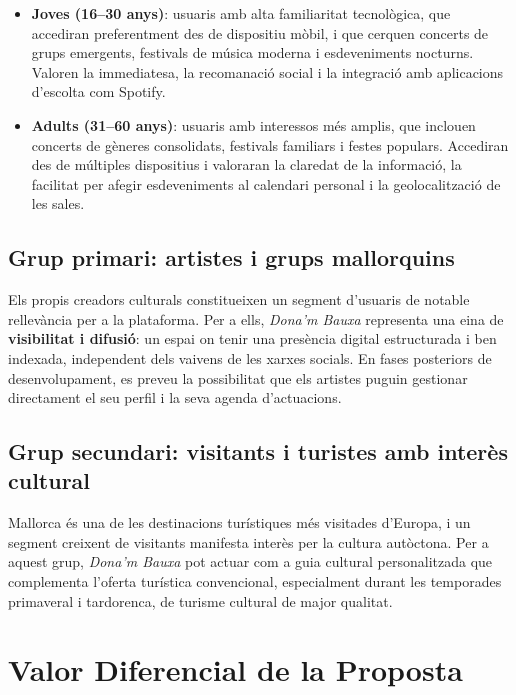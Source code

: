 \begin{itemize}
    \item \textbf{Joves (16--30 anys)}: usuaris amb alta familiaritat tecnològica, que accediran preferentment des de dispositiu mòbil, i que cerquen concerts de grups emergents, festivals de música moderna i esdeveniments nocturns. Valoren la immediatesa, la recomanació social i la integració amb aplicacions d'escolta com Spotify.
    \item \textbf{Adults (31--60 anys)}: usuaris amb interessos més amplis, que inclouen concerts de gèneres consolidats, festivals familiars i festes populars. Accediran des de múltiples dispositius i valoraran la claredat de la informació, la facilitat per afegir esdeveniments al calendari personal i la geolocalització de les sales.
\end{itemize}

\subsection{Grup primari: artistes i grups mallorquins}

Els propis creadors culturals constitueixen un segment d'usuaris de notable rellevància per a la plataforma. Per a ells, \textit{Dona'm Bauxa} representa una eina de \textbf{visibilitat i difusió}: un espai on tenir una presència digital estructurada i ben indexada, independent dels vaivens de les xarxes socials. En fases posteriors de desenvolupament, es preveu la possibilitat que els artistes puguin gestionar directament el seu perfil i la seva agenda d'actuacions.

\subsection{Grup secundari: visitants i turistes amb interès cultural}

Mallorca és una de les destinacions turístiques més visitades d'Europa, i un segment creixent de visitants manifesta interès per la cultura autòctona. Per a aquest grup, \textit{Dona'm Bauxa} pot actuar com a guia cultural personalitzada que complementa l'oferta turística convencional, especialment durant les temporades primaveral i tardorenca, de turisme cultural de major qualitat.

\section{Valor Diferencial de la Proposta}

